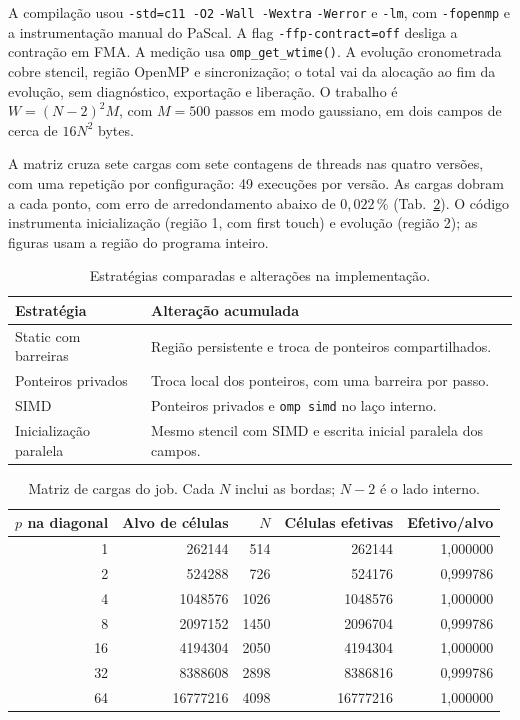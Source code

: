 \documentclass[11pt,letterpaper]{article}
\begin{document}
A compilação usou \texttt{-std=c11 -O2} \texttt{-Wall -Wextra} \texttt{-Werror} e \texttt{-lm}, com \texttt{-fopenmp} e a instrumentação manual do PaScal. A flag \texttt{-ffp-contract=off} desliga a contração em FMA. A medição usa \texttt{omp\_get\_wtime()}. A evolução cronometrada cobre stencil, região OpenMP e sincronização; o total vai da alocação ao fim da evolução, sem diagnóstico, exportação e liberação. O trabalho é $W=(N-2)^2M$, com $M=500$ passos em modo gaussiano, em dois campos de cerca de $16N^2$ bytes.

A matriz cruza sete cargas com sete contagens de threads nas quatro versões, com uma repetição por configuração: 49 execuções por versão. As cargas dobram a cada ponto, com erro de arredondamento abaixo de $0{,}022\,\%$ (Tab.~\ref{tab:cargas}). O código instrumenta inicialização (região 1, com first touch) e evolução (região 2); as figuras usam a região do programa inteiro.

\begin{table}[H]\centering\small
\begin{tabular}{lp{8.2cm}}\hline
Estratégia & Alteração acumulada\\\hline
Static com barreiras & Região persistente e troca de ponteiros compartilhados.\\
Ponteiros privados & Troca local dos ponteiros, com uma barreira por passo.\\
SIMD & Ponteiros privados e \texttt{omp simd} no laço interno.\\
Inicialização paralela & Mesmo stencil com SIMD e escrita inicial paralela dos campos.\\\hline
\end{tabular}
\caption{Estratégias comparadas e alterações na implementação.}
\label{tab:estrategias}
\end{table}

\begin{table}[H]\centering\small
\begin{tabular}{rrrrr}\hline
$p$ na diagonal & Alvo de células & $N$ & Células efetivas & Efetivo/alvo\\\hline
1 & 262144 & 514 & 262144 & 1,000000\\
2 & 524288 & 726 & 524176 & 0,999786\\
4 & 1048576 & 1026 & 1048576 & 1,000000\\
8 & 2097152 & 1450 & 2096704 & 0,999786\\
16 & 4194304 & 2050 & 4194304 & 1,000000\\
32 & 8388608 & 2898 & 8386816 & 0,999786\\
64 & 16777216 & 4098 & 16777216 & 1,000000\\\hline
\end{tabular}
\caption{Matriz de cargas do job. Cada $N$ inclui as bordas; $N-2$ é o lado interno.}
\label{tab:cargas}
\end{table}
\end{document}
